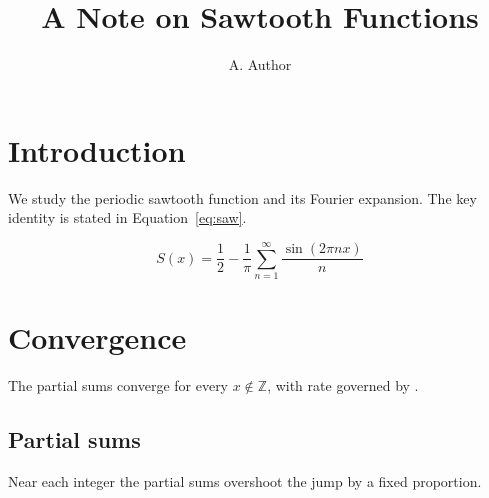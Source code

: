 \documentclass[11pt]{article}
\title{A Note on Sawtooth Functions}
\author{A. Author}
\begin{document}
\maketitle

\section{Introduction}
We study the periodic sawtooth function and its Fourier expansion. The key identity is stated in Equation~\eqref{eq:saw}.

\begin{equation}\label{eq:saw}
  S(x) = \frac{1}{2} - \frac{1}{\pi} \sum_{n=1}^{\infty} \frac{\sin(2\pi n x)}{n}
\end{equation}

\section{Convergence}
The partial sums converge for every $x \notin \mathbb{Z}$, with rate governed by \alpah.

\subsection{Partial sums}
Near each integer the partial sums overshoot the jump by a fixed proportion.


\end{document}
